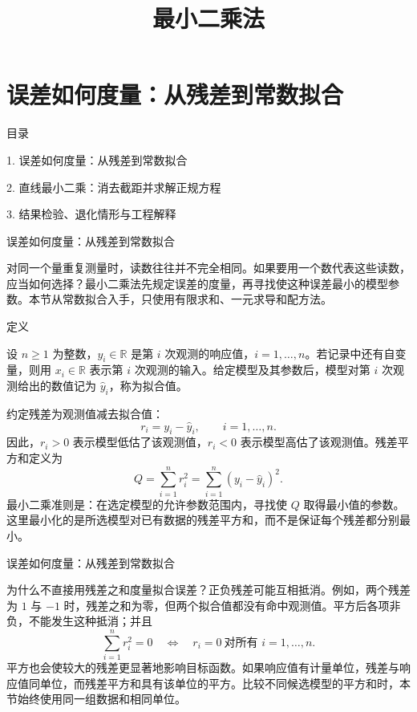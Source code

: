 \documentclass[aspectratio=169,10pt,fontset=fandol]{ctexbeamer}
\title{最小二乘法}
\begin{document}
\section{误差如何度量：从残差到常数拟合}
\begin{frame}[t,fragile]{目录}
\normalsize
{\color{blue}\normalsize 1. 误差如何度量：从残差到常数拟合\par}\vspace{0.22em}
{\color{gray!40}\normalsize 2. 直线最小二乘：消去截距并求解正规方程\par}\vspace{0.22em}
{\color{gray!40}\normalsize 3. 结果检验、退化情形与工程解释\par}\vspace{0.22em}
\end{frame}
\begin{frame}[t,fragile]{误差如何度量：从残差到常数拟合}
\small
{\small
\label{sec:S01}

}
{\small
对同一个量重复测量时，读数往往并不完全相同。如果要用一个数代表这些读数，应当如何选择？最小二乘法先规定误差的度量，再寻找使这种误差最小的模型参数。本节从常数拟合入手，只使用有限求和、一元求导和配方法。\par

}
\begin{block}{定义}
{\small
设 $n\geq 1$ 为整数，$y_i\in\mathbb{R}$ 是第 $i$ 次观测的响应值，$i=1,\ldots,n$。若记录中还有自变量，则用 $x_i\in\mathbb{R}$ 表示第 $i$ 次观测的输入。给定模型及其参数后，模型对第 $i$ 次观测给出的数值记为 $\hat{y}_i$，称为拟合值。

约定残差为观测值减去拟合值：
\[
r_i=y_i-\hat{y}_i,\qquad i=1,\ldots,n.
\]
因此，$r_i>0$ 表示模型低估了该观测值，$r_i<0$ 表示模型高估了该观测值。残差平方和定义为
\[
Q=\sum_{i=1}^{n}r_i^2=\sum_{i=1}^{n}(y_i-\hat{y}_i)^2.
\]
最小二乘准则是：在选定模型的允许参数范围内，寻找使 $Q$ 取得最小值的参数。这里最小化的是所选模型对已有数据的残差平方和，而不是保证每个残差都分别最小。

}
\end{block}
\end{frame}
\begin{frame}[t,fragile]{误差如何度量：从残差到常数拟合}
\footnotesize
{\footnotesize
为什么不直接用残差之和度量拟合误差？正负残差可能互相抵消。例如，两个残差为 $1$ 与 $-1$ 时，残差之和为零，但两个拟合值都没有命中观测值。平方后各项非负，不能发生这种抵消；并且
\[
\sum_{i=1}^{n}r_i^2=0\quad\Longleftrightarrow\quad r_i=0\ \text{对所有 }i=1,\ldots,n.
\]
平方也会使较大的残差更显著地影响目标函数。如果响应值有计量单位，残差与响应值同单位，而残差平方和具有该单位的平方。比较不同候选模型的平方和时，本节始终使用同一组数据和相同单位。\par

}
\end{frame}
\end{document}
